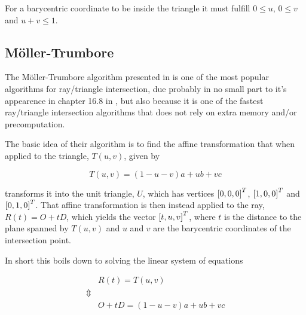 
For a barycentric coordinate to be inside the triangle it must fulfill
$0 \le u$, $0 \le v$ and $u+v \le 1$.

\subsection{Möller-Trumbore}


The Möller-Trumbore algorithm presented in 
is one of the most popular algorithms for ray/triangle intersection,
due probably in no small part to it's appearence in chapter 16.8 in
, but also because it is one of the fastest
ray/triangle intersection algorithms that does not rely on extra
memory and/or precomputation.



The basic idea of their algorithm is to find the affine transformation
that when applied to the triangle, $T(u,v)$, given by

\begin{displaymath}
  T(u,v) = (1-u-v)a + ub + vc
\end{displaymath}

transforms it into the unit triangle, $U$, which has vertices
$\left[0, 0, 0 \right]^T$, $\left[1, 0, 0 \right]^T$ and
$\left[0, 1, 0 \right]^T$. That affine transformation is then instead
applied to the ray, $R(t) = O + tD$, which yields the vector
$\left[t, u, v \right]^T$, where $t$ is the distance to the plane spanned
by $T(u,v)$ and $u$ and $v$ are the barycentric coordinates of the
intersection point.

In short this boils down to solving the linear system of equations

\begin{displaymath}
  \begin{array}{rl}
    & R(t) = T(u,v) \\
    \Updownarrow \\
    & O + tD = (1-u-v)a + ub + vc \\
  \end{array}
\end{displaymath}


